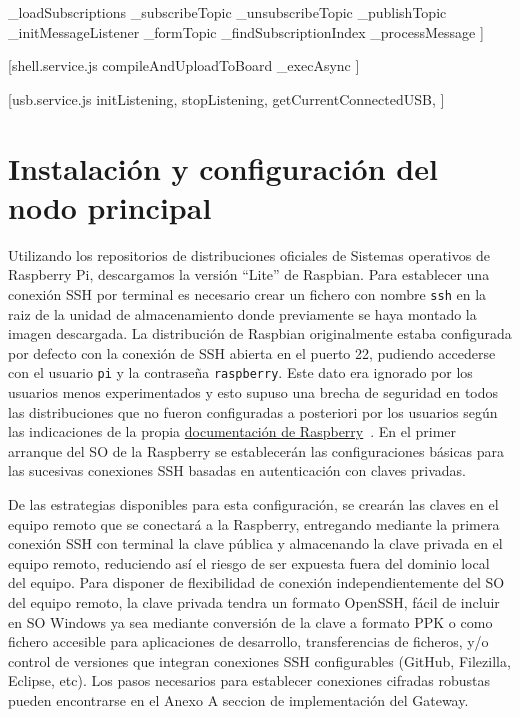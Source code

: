   _loadSubscriptions
  _subscribeTopic
  _unsubscribeTopic
  _publishTopic
  _initMessageListener
  _formTopic
  _findSubscriptionIndex
  _processMessage
  ]
  
  [shell.service.js 
  compileAndUploadToBoard
  _execAsync
  ]

  [usb.service.js 
  initListening,
  stopListening,
  getCurrentConnectedUSB,
  ]

\section{Instalación y configuración del nodo principal}
\label{makereference4.7}
 Utilizando los repositorios de distribuciones oficiales de Sistemas operativos de Raspberry Pi, descargamos la versión ``Lite'' de Raspbian. Para establecer una conexión SSH por terminal es necesario crear un fichero con nombre \verb|ssh| en la raiz de la unidad de almacenamiento donde previamente se haya montado la imagen descargada. La distribución de Raspbian originalmente estaba configurada por defecto con la conexión de SSH abierta en el puerto 22, pudiendo accederse con el usuario \verb|pi| y la contraseña \verb|raspberry|. Este dato era ignorado por los usuarios menos experimentados y esto supuso una brecha de seguridad en todos las distribuciones que no fueron configuradas a posteriori por los usuarios según las indicaciones de la propia \href{https://www.raspberrypi.org/documentation/configuration/security.md}{documentación de Raspberry}~\cite{securingyourraspberrypi}. En el primer arranque del SO de la Raspberry se establecerán las configuraciones básicas para las sucesivas conexiones SSH basadas en autenticación con claves privadas.

 De las estrategias disponibles para esta configuración, se crearán las claves en el equipo remoto que se conectará a la Raspberry, entregando mediante la primera conexión SSH con terminal la clave pública y almacenando la clave privada en el equipo remoto, reduciendo así el riesgo de ser expuesta fuera del dominio local del equipo. Para disponer de flexibilidad de conexión independientemente del SO del equipo remoto, la clave privada tendra un formato OpenSSH, fácil de incluir en SO Windows ya sea mediante conversión de la clave a formato PPK o como fichero accesible para aplicaciones de desarrollo, transferencias de ficheros, y/o control de versiones que integran conexiones SSH configurables (GitHub, Filezilla, Eclipse, etc). Los pasos necesarios para establecer conexiones cifradas robustas pueden encontrarse en el Anexo A seccion de implementación del Gateway.


